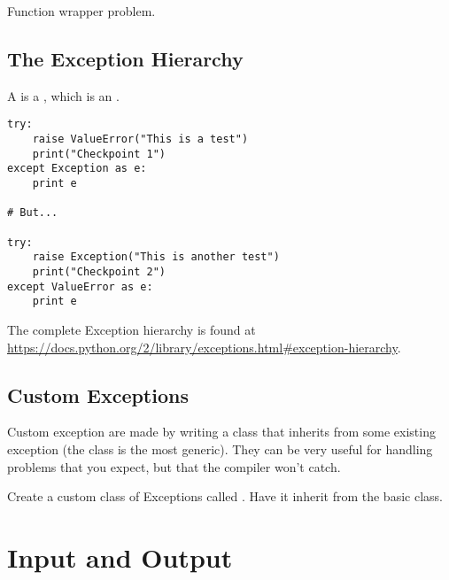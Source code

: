 \begin{comment}
In [2]: def forever():
   ...:     i = 0
   ...:     start = time()
   ...:     try:
   ...:         while True:
   ...:             i += 1
   ...:             if i %
   ...:                 if time() - start > 10:
   ...:                     raise RuntimeError
   ...:     except KeyboardInterrupt:
   ...:         print("Process interrupted")
   ...:     except RuntimeError:
   ...:         print("Process terminated")
   ...:     finally:
   ...:         return i
\end{comment}

\begin{problem}
Function wrapper problem.
\end{problem}

\subsection*{The Exception Hierarchy}

A  is a , which is an .
\begin{lstlisting}
try:
    raise ValueError("This is a test")
    print("Checkpoint 1")
except Exception as e:
    print e

# But...

try:
    raise Exception("This is another test")
    print("Checkpoint 2")
except ValueError as e:
    print e
\end{lstlisting}

The complete Exception hierarchy is found at \url{https://docs.python.org/2/library/exceptions.html#exception-hierarchy}.

\subsection*{Custom Exceptions}

Custom exception are made by writing a class that inherits from some existing exception (the  class is the most generic).
They can be very useful for handling problems that you expect, but that the compiler won't catch.

\begin{problem}
Create a custom class of Exceptions called .
Have it inherit from the basic  class.
\end{problem}

\section*{Input and Output}

